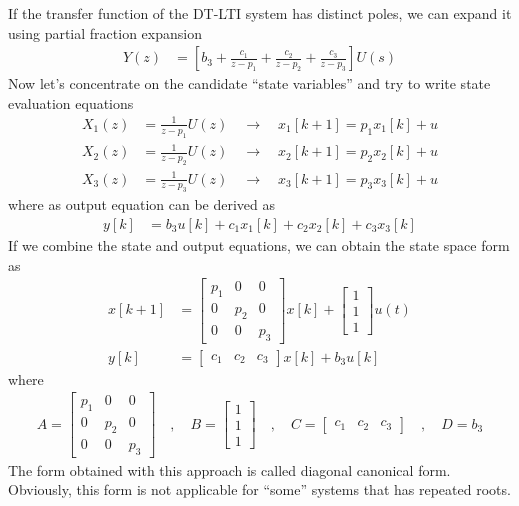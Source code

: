 \documentclass[twoside]{article}
\begin{document}
If the transfer function of the DT-LTI system 
has distinct poles, we can expand it 
using partial fraction expansion 
%
\begin{align*}
Y(z) &= \left[ b_3 + \frac{c_1}{z - p_1} + \frac{c_2}{z - p_2} 
+ \frac{c_3}{z - p_3} \right] U(s)
\end{align*}
%
Now let's concentrate on the candidate ``state variables''
and try to write state evaluation equations
%
\begin{align*}
X_1(z) &= \frac{1}{z - p_1} U(z) \quad \rightarrow \quad x_1[k+1] = p_1 x_1[k] + u
\\
X_2(z) &= \frac{1}{z - p_2} U(z) \quad \rightarrow \quad x_2[k+1] =
         p_2 x_2[k] + u
\\
X_3(z) &= \frac{1}{z - p_3} U(z) \quad \rightarrow \quad x_3[k+1] = p_3 x_3[k] + u
\end{align*}
%
where as output equation can be derived as
%
\begin{align*}
y[k] &= b_3 u[k] + c_1 x_1[k] + c_2 x_2[k] + c_3 x_3[k]
\end{align*}
%
If we combine the state and output equations, we
can obtain the state space form as
%
\begin{align*}
  x[k+1] &= \left[ \begin{array}{ccc} p_1 & 0 & 0\\ 0 & p_2 & 0
    \\ 0 & 0 & p_3 \end{array} \right] x[k]
   + 
  \left[ \begin{array}{c} 1 \\ 1
    \\ 1 \end{array} \right] u(t)
\\
y[k] &= \left[ \begin{array}{ccc} c_1 & c_2 & c_3 \end{array} \right] x[k]
+ b_3 u[k]
\end{align*}
%
where 
%
\begin{align*}
A = \left[ \begin{array}{ccc} p_1 & 0 & 0 \\ 0 & p_2 & 0
    \\ 0 & 0 & p_3 \end{array} \right]
\quad , \quad 
B = \left[ \begin{array}{c} 1 \\ 1
    \\ 1 \end{array} \right]
\quad , \quad
C = \left[ \begin{array}{ccc} c_1 & c_2 & c_3 \end{array} \right]
\quad , \quad
D = b_3
\end{align*}
%
The form obtained with this approach is called
diagonal canonical form. Obviously, this form is
not applicable for ``some'' systems that has repeated roots.
\end{document}
